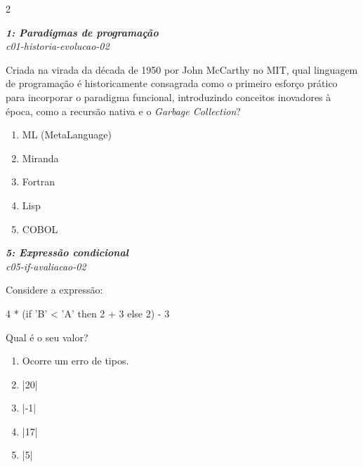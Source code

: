 \documentclass[a4paper,10pt,brazil]{article}
\begin{document}
\begin{multicols}{2}
\begin{enumerate}
\end{enumerate}

\begin{flushright}
  \footnotesize
  \textit{\textbf{1: Paradigmas de programação}}\\
  \textit{c01-historia-evolucao-02}\\

\end{flushright}
Criada na virada da década de 1950 por John McCarthy no MIT, qual linguagem de programação é historicamente consagrada como o primeiro esforço prático para incorporar o paradigma funcional, introduzindo conceitos inovadores à época, como a recursão nativa e o \emph{Garbage Collection}?

\begin{enumerate}
  \item ML (MetaLanguage)

  \item Miranda

  \item Fortran

  \item Lisp

  \item COBOL


\end{enumerate}

\begin{flushright}
  \footnotesize
  \textit{\textbf{5: Expressão condicional}}\\
  \textit{c05-if-avaliacao-02}\\

\end{flushright}
Considere a expressão:
\begin{haskellcode}
4 * (if 'B' < 'A' then 2 + 3 else 2) - 3
\end{haskellcode}
Qual é o seu valor?

\begin{enumerate}
  \item Ocorre um erro de tipos.

  \item \haskellinline|20|

  \item \haskellinline|-1|

  \item \haskellinline|17|

  \item \haskellinline|5|



\end{enumerate}
\end{multicols}
\end{document}
